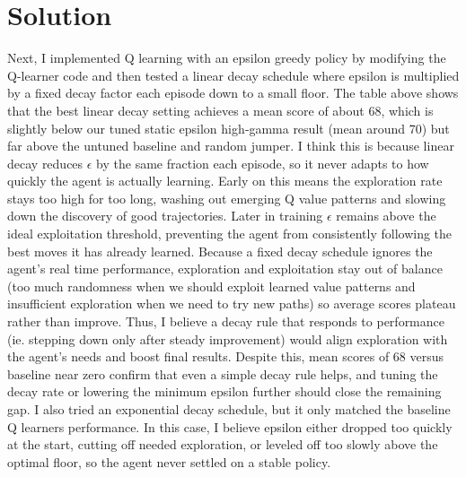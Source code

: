 \documentclass[submit]{../harvardml}
\newenvironment{solution}
  {\color{blue}\section*{Solution}}
{}
\begin{document}
\begin{solution}
Next, I implemented Q learning with an epsilon greedy policy by modifying the Q-learner code and then tested a linear decay schedule where epsilon is multiplied by a fixed decay factor each episode down to a small floor.  The table above shows that the best linear decay setting achieves a mean score of about 68, which is slightly below our tuned static epsilon high‐gamma result (mean around 70) but far above the untuned baseline and random jumper. I think this is because linear decay reduces $\epsilon$ by the same fraction each episode, so it never adapts to how quickly the agent is actually learning. Early on this means the exploration rate stays too high for too long, washing out emerging Q value patterns and slowing down the discovery of good trajectories. Later in training $\epsilon$ remains above the ideal exploitation threshold, preventing the agent from consistently following the best moves it has already learned. Because a fixed decay schedule ignores the agent’s real time performance, exploration and exploitation stay out of balance (too much randomness when we should exploit learned value patterns and insufficient exploration when we need to try new paths) so average scores plateau rather than improve. Thus, I believe a decay rule that responds to performance (ie. stepping down only after steady improvement) would align exploration with the agent’s needs and boost final results. Despite this, mean scores of 68 versus baseline near zero confirm that even a simple decay rule helps, and tuning the decay rate or lowering the minimum epsilon further should close the remaining gap. I also tried an exponential decay schedule, but it only matched the baseline Q learners performance. In this case, I believe epsilon either dropped too quickly at the start, cutting off needed exploration, or leveled off too slowly above the optimal floor, so the agent never settled on a stable policy.


\end{solution}
\end{document}
